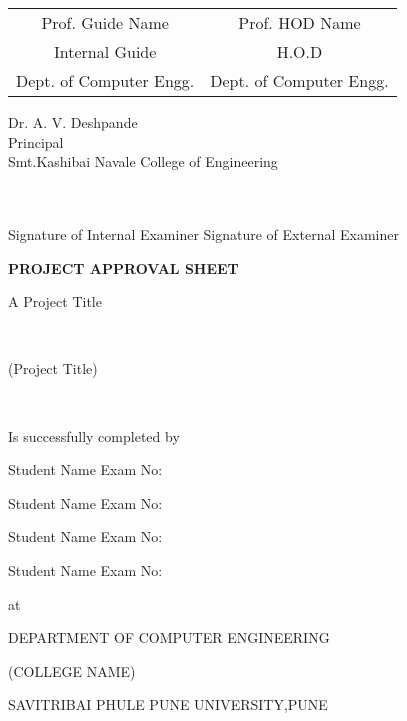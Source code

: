 \documentclass[oneside,a4paper,12pt]{report}
\begin{document}
\bgroup
\def\arraystretch{0.7}
\begin{tabular}{c c }
Prof. Guide Name &  \hspace{50 mm} Prof. HOD Name \\								
Internal Guide   &  \hspace{50 mm} H.O.D \\
Dept. of Computer Engg.  &	\hspace{50 mm}Dept. of Computer Engg.  \\
\end{tabular}
\begin{center}
{
Dr. A. V. Deshpande \\
Principal\\
Smt.Kashibai Navale College of Engineering  
}
\end{center}
\\\\
Signature of Internal Examiner \hspace{30 mm} Signature of External Examiner
\newpage
\begin{center}
\textbf{PROJECT APPROVAL SHEET}
\end{center}
\begin{center}
 A Project Title
 \end{center} \\
\begin{center}
(Project Title)
\end{center}\\
\begin{center}
Is successfully completed by 
\end{center}
\centerline{Student Name  \hspace{25 mm} Exam No: } 
\centerline{Student Name \hspace{25 mm} Exam No:  } 
\centerline{Student Name \hspace{25 mm} Exam No: }
\centerline{Student Name \hspace{25 mm} Exam No: }
\begin{center}
 at
 \end{center} 
 \begin{center}
 DEPARTMENT OF COMPUTER ENGINEERING
 \end{center}
 \begin{center}
 (COLLEGE NAME)
 \end{center}
 \begin{center}
 SAVITRIBAI PHULE PUNE UNIVERSITY,PUNE
 \end{center}
 
\end{document}
